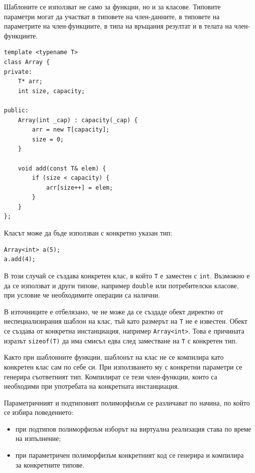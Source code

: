 Шаблоните се използват не само за функции, но и за класове. Типовите параметри могат да участват в типовете на член-данните, в типовете на параметрите на член-функциите, в типа на връщания резултат и в телата на член-функциите.

\begin{verbatim}
template <typename T>
class Array {
private:
    T* arr;
    int size, capacity;

public:
    Array(int _cap) : capacity(_cap) {
        arr = new T[capacity];
        size = 0;
    }

    void add(const T& elem) {
        if (size < capacity) {
            arr[size++] = elem;
        }
    }
};
\end{verbatim}

Класът може да бъде използван с конкретно указан тип:

\begin{verbatim}
Array<int> a(5);
a.add(4);
\end{verbatim}

В този случай се създава конкретен клас, в който \texttt{T} е заместен с \texttt{int}. Възможно е да се използват и други типове, например \texttt{double} или потребителски класове, при условие че необходимите операции са налични.

\begin{supp}
В източниците е отбелязано, че не може да се създаде обект директно от неспециализирания шаблон на клас, тъй като размерът на \texttt{T} не е известен. Обект се създава от конкретна инстанциация, например \texttt{Array<int>}. Това е причината изразът \texttt{sizeof(T)} да има смисъл едва след заместване на \texttt{T} с конкретен тип.
\end{supp}

Както при шаблонните функции, шаблонът на клас не се компилира като конкретен клас сам по себе си. При използването му с конкретни параметри се генерира съответният тип. Компилират се тези член-функции, които са необходими при употребата на конкретната инстанциация.

Параметричният и подтиповият полиморфизъм се различават по начина, по който се избира поведението:

\begin{itemize}
    \item при подтипов полиморфизъм изборът на виртуална реализация става по време на изпълнение;
    \item при параметричен полиморфизъм конкретният код се генерира и компилира за конкретните типове.
\end{itemize}

